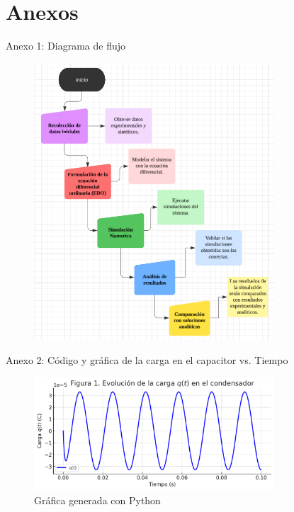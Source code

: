 


\section{Anexos}
\vspace*{2cm}
Anexo 1: Diagrama de flujo
\begin{figure}[H]
	\centering
	\includegraphics[width=0.8\textwidth]{5.png}
\end{figure}
\newpage
Anexo 2: Código y gráfica de la carga en el capacitor vs. Tiempo

\begin{figure}[H]
	\centering
	\includegraphics[width=0.8\textwidth]{7.png}
	\caption{Gráfica generada con Python}
\end{figure}

